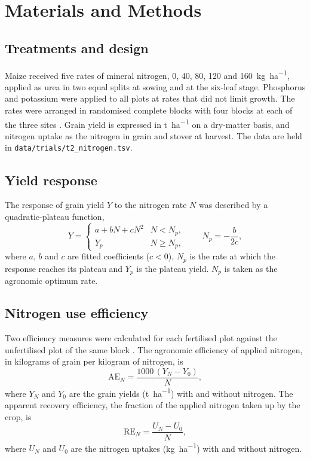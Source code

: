 \section{Materials and Methods}

\subsection{Treatments and design}
Maize received five rates of mineral nitrogen, 0, 40, 80, 120 and
\SI{160}{\kilo\gram\per\hectare}, applied as urea in two equal splits at
sowing and at the six-leaf stage. Phosphorus and potassium were applied to all
plots at rates that did not limit growth. The rates were arranged in
randomised complete blocks with four blocks at each of the three sites
\parencite{gomez1984}. Grain yield is expressed in \si{\tonne\per\hectare} on a
dry-matter basis, and nitrogen uptake as the nitrogen in grain and stover at
harvest. The data are held in \texttt{data/trials/t2\_nitrogen.tsv}.

\subsection{Yield response}
The response of grain yield $Y$ to the nitrogen rate $N$ was described by a
quadratic-plateau function,
\begin{equation}
  Y =
  \begin{cases}
    a + bN + cN^2 & N < N_p,\\
    Y_p & N \ge N_p,
  \end{cases}
  \qquad N_p = -\frac{b}{2c},
  \label{eq:quadplateau}
\end{equation}
where $a$, $b$ and $c$ are fitted coefficients ($c < 0$), $N_p$ is the rate at
which the response reaches its plateau and $Y_p$ is the plateau yield. $N_p$ is
taken as the agronomic optimum rate.

\subsection{Nitrogen use efficiency}
Two efficiency measures were calculated for each fertilised plot against the
unfertilised plot of the same block \parencite{cassman2002,ladha2005}. The
agronomic efficiency of applied nitrogen, in kilograms of grain per kilogram of
nitrogen, is
\begin{equation}
  \mathrm{AE}_N = \frac{1000\,(Y_N - Y_0)}{N},
  \label{eq:ae}
\end{equation}
where $Y_N$ and $Y_0$ are the grain yields (\si{\tonne\per\hectare}) with and
without nitrogen. The apparent recovery efficiency, the fraction of the applied
nitrogen taken up by the crop, is
\begin{equation}
  \mathrm{RE}_N = \frac{U_N - U_0}{N},
  \label{eq:re}
\end{equation}
where $U_N$ and $U_0$ are the nitrogen uptakes (\si{\kilo\gram\per\hectare})
with and without nitrogen.
